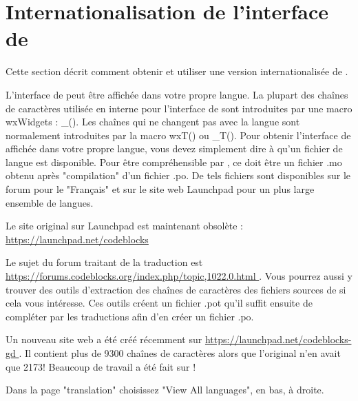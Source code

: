 ﻿\section{Internationalisation de l'interface de \codeblocks}\label{sec:cb_Internationalization}

Cette section décrit comment obtenir et utiliser une version internationalisée de \codeblocks.

L'interface de \codeblocks peut être affichée dans votre propre langue. La plupart des chaînes de caractères utilisée en interne pour l'interface de \codeblocks sont introduites par une macro wxWidgets : \_(). Les chaînes qui ne changent pas avec la langue sont normalement introduites par la macro wxT() ou \_T(). Pour obtenir l'interface de \codeblocks affichée dans votre propre langue, vous devez simplement dire à \codeblocks qu'un fichier de langue est disponible. Pour être compréhensible par \codeblocks, ce doit être un fichier .mo obtenu après "compilation" d'un fichier .po. De tels fichiers sont disponibles sur le forum pour le "Français" et sur le site web Launchpad pour un plus large ensemble de langues.

\begin{description}
\item Le site original sur Launchpad est maintenant obsolète : \url{https://launchpad.net/codeblocks }
\item Le sujet du forum traitant de la traduction est \url{https://forums.codeblocks.org/index.php/topic,1022.0.html }. Vous pourrez aussi y trouver des outils d'extraction des chaînes de caractères des fichiers sources de \codeblocks si cela vous intéresse. Ces outils créent un fichier .pot qu'il suffit ensuite de compléter par les traductions afin d'en créer un fichier .po.
\item Un nouveau site web a été créé récemment sur \url{https://launchpad.net/codeblocks-gd }. Il contient plus de 9300 chaînes de caractères alors que l'original n'en avait que 2173! Beaucoup de travail a été fait sur \codeblocks !
\end{description}

Dans la page "translation" choisissez "View All languages", en bas, à droite.

